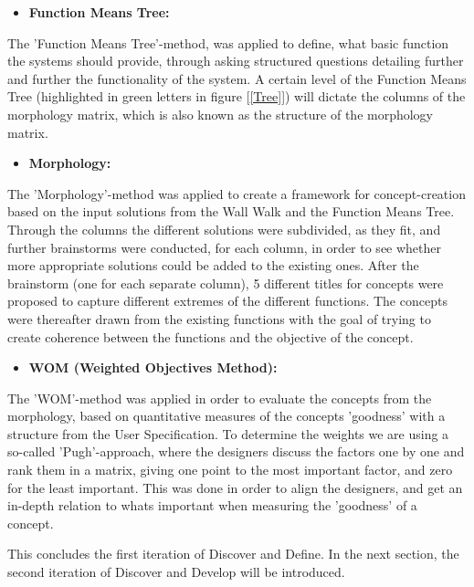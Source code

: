 \begin{itemize}
    \item \bf{Function Means Tree:}
\end{itemize}

The 'Function Means Tree'-method, was applied to define, what basic function the systems should provide, through asking structured questions detailing further and further the functionality of the system. A certain level of the Function Means Tree (highlighted in green letters in figure [\ref{Tree}]) will dictate the columns of the morphology matrix, which is also known as the structure of the morphology matrix.

\begin{itemize}
    \item \bf{Morphology:}
\end{itemize}

The 'Morphology'-method was applied to create a framework for concept-creation based on the input solutions from the Wall Walk and the Function Means Tree. Through the columns the different solutions were subdivided, as they fit, and further brainstorms were conducted, for each column, in order to see whether more appropriate solutions could be added to the existing ones. After the brainstorm (one for each separate column), 5 different titles for concepts were proposed to capture different extremes of the different functions. The concepts were thereafter drawn from the existing functions with the goal of trying to create coherence between the functions and the objective of the concept.

\begin{itemize}
    \item \bf{WOM (Weighted Objectives Method):}
\end{itemize}

The 'WOM'-method was applied in order to evaluate the concepts from the morphology, based on quantitative measures of the concepts 'goodness' with a structure from the User Specification. To determine the weights we are using a so-called 'Pugh'-approach, where the designers discuss the factors one by one and rank them in a matrix, giving one point to the most important factor, and zero for the least important. This was done in order to align the designers, and get an in-depth relation to whats important when measuring the 'goodness' of a concept.

This concludes the first iteration of Discover and Define. In the next section, the second iteration of Discover and Develop will be introduced.

